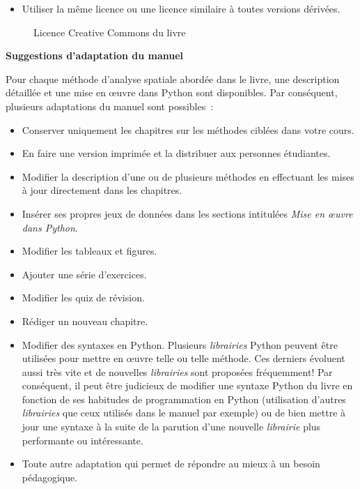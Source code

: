 \documentclass[
  letterpaper,
  DIV=11,
  numbers=noendperiod]{scrreprt}
\providecommand{\tightlist}{%
  \setlength{\itemsep}{0pt}\setlength{\parskip}{0pt}}\usepackage{longtable,booktabs,array}
\begin{document}
\begin{itemize}
\tightlist
\item
  Utiliser la même licence ou une licence similaire à toutes versions
  dérivées.
\end{itemize}

\begin{figure}


\caption{\label{fig-Licence}Licence Creative Commons du livre}

\end{figure}%

\textbf{Suggestions d'adaptation du manuel}

Pour chaque méthode d'analyse spatiale abordée dans le livre, une
description détaillée et une mise en œuvre dans Python sont disponibles.
Par conséquent, plusieurs adaptations du manuel sont possibles~:

\begin{itemize}
\item
  Conserver uniquement les chapitres sur les méthodes ciblées dans votre
  cours.
\item
  En faire une version imprimée et la distribuer aux personnes
  étudiantes.
\item
  Modifier la description d'une ou de plusieurs méthodes en effectuant
  les mises à jour directement dans les chapitres.
\item
  Insérer ses propres jeux de données dans les sections intitulées
  \emph{Mise en œuvre dans Python}.
\item
  Modifier les tableaux et figures.
\item
  Ajouter une série d'exercices.
\item
  Modifier les quiz de révision.
\item
  Rédiger un nouveau chapitre.
\item
  Modifier des syntaxes en Python. Plusieurs \emph{librairies} Python
  peuvent être utilisées pour mettre en œuvre telle ou telle méthode.
  Ces derniers évoluent aussi très vite et de nouvelles
  \emph{librairies} sont proposées fréquemment! Par conséquent, il peut
  être judicieux de modifier une syntaxe Python du livre en fonction de
  ses habitudes de programmation en Python (utilisation d'autres
  \emph{librairies} que ceux utilisés dans le manuel par exemple) ou de
  bien mettre à jour une syntaxe à la suite de la parution d'une
  nouvelle \emph{librairie} plus performante ou intéressante.
\item
  Toute autre adaptation qui permet de répondre au mieux à un besoin
  pédagogique.
\end{itemize}
\end{document}
